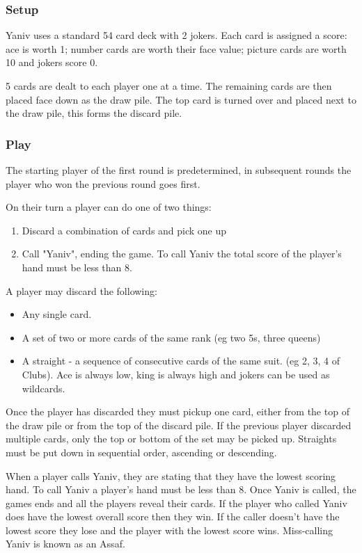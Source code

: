 \documentclass[../main.tex]{subfiles}
\begin{document}
\subsubsection{Setup}
Yaniv uses a standard 54 card deck with 2 jokers. Each card is assigned a score: ace is worth 1; number cards are worth their face value; picture cards are worth 10 and jokers score 0. 

5 cards are dealt to each player one at a time. The remaining cards are then placed face down as the draw pile. The top card is turned over and placed next to the draw pile, this forms the discard pile. 

\subsubsection{Play}
The starting player of the first round is predetermined, in subsequent rounds the player who won the previous round goes first. 

On their turn a player can do one of two things:
\begin{enumerate}[nosep]
    \item Discard a combination of cards and pick one up
    \item Call "Yaniv", ending the game. To call Yaniv the total score of the player's hand must be less than 8.
\end{enumerate}

A player may discard the following:
\begin{itemize}[nosep]
    \item Any single card.
    \item A set of two or more cards of the same rank (eg two 5s, three queens)
    \item A straight - a sequence of consecutive cards of the same suit. (eg 2, 3, 4 of Clubs). Ace is always low, king is always high and jokers can be used as wildcards.
\end{itemize}

Once the player has discarded they must pickup one card, either from the top of the draw pile or from the top of the discard pile. If the previous player discarded multiple cards, only the top or bottom of the set may be picked up. Straights must be put down in sequential order, ascending or descending. 

When a player calls Yaniv, they are stating that they have the lowest scoring hand. To call Yaniv a player's hand must be less than 8. Once Yaniv is called, the games ends and all the players reveal their cards. If the player who called Yaniv does have the lowest overall score then they win. If the caller doesn't have the lowest score they lose and the player with the lowest score wins. Miss-calling Yaniv is known as an Assaf.
\end{document}
